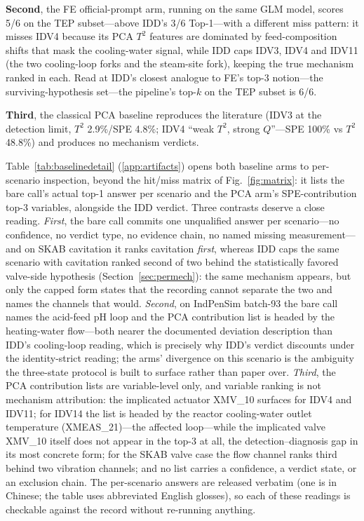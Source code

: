 \documentclass[preprint,10pt]{elsarticle}
\begin{document}
\textbf{Second}, the FE official-prompt arm, running on the same GLM model, scores 5/6 on the TEP subset---above IDD's 3/6 Top-1---with a different miss pattern: it misses IDV4 because its PCA $T^2$ features are dominated by feed-composition shifts that mask the cooling-water signal, while IDD caps IDV3, IDV4 and IDV11 (the two cooling-loop forks and the steam-site fork), keeping the true mechanism ranked in each. Read at IDD's closest analogue to FE's top-3 notion---the surviving-hypothesis set---the pipeline's top-$k$ on the TEP subset is 6/6.

\textbf{Third}, the classical PCA baseline reproduces the literature (IDV3 at the detection limit, $T^2$ 2.9\%/SPE 4.8\%; IDV4 ``weak $T^2$, strong $Q$''---SPE 100\% vs $T^2$ 48.8\%) and produces no mechanism verdicts.

Table~\ref{tab:baselinedetail} (\ref{app:artifacts}) opens both baseline arms to per-scenario inspection, beyond the hit/miss matrix of Fig.~\ref{fig:matrix}: it lists the bare call's actual top-1 answer per scenario and the PCA arm's SPE-contribution top-3 variables, alongside the IDD verdict. Three contrasts deserve a close reading. \emph{First}, the bare call commits one unqualified answer per scenario---no confidence, no verdict type, no evidence chain, no named missing measurement---and on SKAB cavitation it ranks cavitation \emph{first}, whereas IDD caps the same scenario with cavitation ranked second of two behind the statistically favored valve-side hypothesis (Section~\ref{sec:permech}): the same mechanism appears, but only the capped form states that the recording cannot separate the two and names the channels that would. \emph{Second}, on IndPenSim batch-93 the bare call names the acid-feed pH loop and the PCA contribution list is headed by the heating-water flow---both nearer the documented deviation description than IDD's cooling-loop reading, which is precisely why IDD's verdict discounts under the identity-strict reading; the arms' divergence on this scenario is the ambiguity the three-state protocol is built to surface rather than paper over. \emph{Third}, the PCA contribution lists are variable-level only, and variable ranking is not mechanism attribution: the implicated actuator XMV\_10 surfaces for IDV4 and IDV11; for IDV14 the list is headed by the reactor cooling-water outlet temperature (XMEAS\_21)---the affected loop---while the implicated valve XMV\_10 itself does not appear in the top-3 at all, the detection--diagnosis gap in its most concrete form; for the SKAB valve case the flow channel ranks third behind two vibration channels; and no list carries a confidence, a verdict state, or an exclusion chain. The per-scenario answers are released verbatim (one is in Chinese; the table uses abbreviated English glosses), so each of these readings is checkable against the record without re-running anything.
\end{document}
